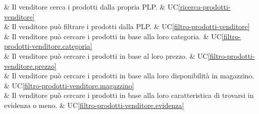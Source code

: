  & Il venditore cerca i prodotti dalla propria PLP. & UC\ref{ricerca-prodotti-venditore} \\
    
 & Il venditore può filtrare i prodotti dalla PLP. & UC\ref{filtro-prodotti-venditore} \\
    
 & Il venditore può cercare i prodotti in base alla loro categoria. & UC\ref{filtro-prodotti-venditore.categoria} \\
    
 & Il venditore può cercare i prodotti in base al loro prezzo. & UC\ref{filtro-prodotti-venditore.prezzo} \\
    
 & Il venditore può cercare i prodotti in base alla loro disponibilità in magazzino. & UC\ref{filtro-prodotti-venditore.magazzino} \\

 & Il venditore può cercare i prodotti in base alla loro caratteristica di trovarsi in evidenza o meno. & UC\ref{filtro-prodotti-venditore.evidenza} \\
